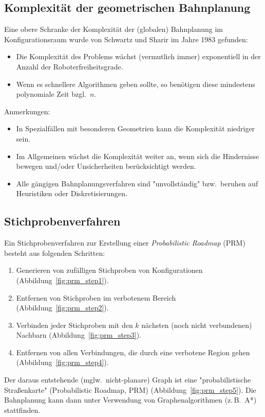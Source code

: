 \documentclass[a4paper, 11pt, accentcolor = tud3b]{tudreport}
\newcommand{\bzw}{bzw.~}
\newcommand{\bzgl}{bzgl.~}
\newcommand{\zB}{z.\,B.~}
\newcommand{\mglw}{mglw.~}
\begin{document}
			\subsection{Komplexität der geometrischen Bahnplanung}
				Eine obere Schranke der Komplexität der (globalen) Bahnplanung im Konfigurationsraum wurde von Schwartz und Sharir im Jahre 1983 gefunden:
				\begin{itemize}
					\item Die Komplexität des Problems wächst (vermutlich immer) exponentiell in der Anzahl der Roboterfreiheitsgrade.
					\item Wenn es schnellere Algorithmen geben sollte, so benötigen diese mindestens polynomiale Zeit \bzgl \(n\).
				\end{itemize}
			
				Anmerkungen:
				\begin{itemize}
					\item In Spezialfällen mit besonderen Geometrien kann die Komplexität niedriger sein.
					\item Im Allgemeinen wächst die Komplexität weiter an, wenn sich die Hindernisse bewegen und/oder Unsicherheiten berücksichtigt werden.
					\item Alle gängigen Bahnplanungsverfahren sind "unvollständig" \bzw beruhen auf Heuristiken oder Diskretisierungen.
				\end{itemize}

			\subsection{Stichprobenverfahren}
				Ein Stichprobenverfahren zur Erstellung einer \emph{Probabilistic Roadmap} (PRM) besteht aus folgenden Schritten:
				\begin{enumerate}
					\item Generieren von zufälligen Stichproben von Konfigurationen (Abbildung~\ref{fig:prm_step1}).
					\item Entfernen von Stichproben im verbotenem Bereich (Abbildung~\ref{fig:prm_step2}).
					\item Verbinden jeder Stichproben mit den \(k\) nächsten (noch nicht verbundenen) Nachbarn (Abbildung~\ref{fig:prm_step3}).
					\item Entfernen von allen Verbindungen, die durch eine verbotene Region gehen (Abbildung~\ref{fig:prm_step4}).
				\end{enumerate}
				Der daraus entstehende (\mglw nicht-planare) Graph ist eine "probabilistische Straßenkarte" (Probabilistic Roadmap, PRM) (Abbildung~\ref{fig:prm_step5}). Die Bahnplanung kann dann unter Verwendung von Graphenalgorithmen (\zB A*) stattfinden.
\end{document}
